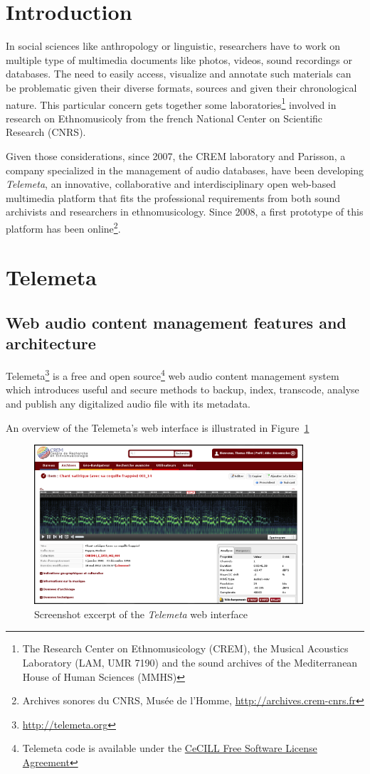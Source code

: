 \documentclass[runningheads,a4paper]{llncs}
\begin{document}
\section{Introduction}

In social sciences like anthropology or linguistic, researchers have to work on multiple type of multimedia documents like photos, videos, sound recordings or databases. The need to easily access, visualize and annotate such materials can be problematic given their diverse formats, sources and given their chronological nature.
This particular concern gets together some laboratories\footnote{The Research Center on Ethnomusicology (CREM), the Musical Acoustics Laboratory (LAM, UMR 7190) and the sound archives of the Mediterranean House of Human Sciences (MMHS)} involved in research on Ethnomusicoly from  the french National Center on Scientific Research (CNRS).

Given those considerations, since 2007, the CREM laboratory and Parisson, a company specialized in the management of audio databases, have been developing \emph{Telemeta}, an innovative, collaborative and interdisciplinary open web-based multimedia platform that fits the professional requirements from both sound archivists and researchers in ethnomusicology. Since 2008, a first prototype of this platform has been online\footnote{Archives sonores du CNRS, Musée de l'Homme, \url{http://archives.crem-cnrs.fr}}.

\section{Telemeta}\label{sec:Telemeta}\vspace{-0.2cm}
\subsection{Web audio content management features and architecture}
Telemeta\footnote{\url{http://telemeta.org}} is a free and open source\footnote{Telemeta code is available under the \href{http://cecill.info/licences/Licence_CeCILL_V2-en.html}{CeCILL Free Software License Agreement}} web audio content management system which introduces useful and secure methods to backup, index, transcode, analyse and publish any digitalized audio file with its metadata. 

An overview of the Telemeta's web interface is illustrated in Figure~\ref{fig:Telemeta}
\begin{figure}[htbp]
  \centering
  \includegraphics[width=10cm]{img/telemeta.png}
  \caption{Screenshot excerpt of the \emph{Telemeta} web interface}\label{fig:Telemeta}
\end{figure}
\end{document}
